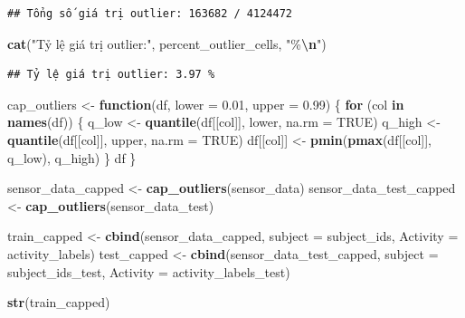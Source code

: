 \documentclass[
]{article}
\newenvironment{Shaded}{\begin{snugshade}}{\end{snugshade}}
\newcommand{\AttributeTok}[1]{\textcolor[rgb]{0.13,0.29,0.53}{#1}}
\newcommand{\ConstantTok}[1]{\textcolor[rgb]{0.56,0.35,0.01}{#1}}
\newcommand{\ControlFlowTok}[1]{\textcolor[rgb]{0.13,0.29,0.53}{\textbf{#1}}}
\newcommand{\FloatTok}[1]{\textcolor[rgb]{0.00,0.00,0.81}{#1}}
\newcommand{\FunctionTok}[1]{\textcolor[rgb]{0.13,0.29,0.53}{\textbf{#1}}}
\newcommand{\NormalTok}[1]{#1}
\newcommand{\OtherTok}[1]{\textcolor[rgb]{0.56,0.35,0.01}{#1}}
\newcommand{\SpecialCharTok}[1]{\textcolor[rgb]{0.81,0.36,0.00}{\textbf{#1}}}
\newcommand{\StringTok}[1]{\textcolor[rgb]{0.31,0.60,0.02}{#1}}
\begin{document}
\begin{verbatim}
## Tổng số giá trị outlier: 163682 / 4124472
\end{verbatim}

\begin{Shaded}
\begin{Highlighting}[]
\FunctionTok{cat}\NormalTok{(}\StringTok{"Tỷ lệ giá trị outlier:"}\NormalTok{, percent\_outlier\_cells, }\StringTok{"\%}\SpecialCharTok{\textbackslash{}n}\StringTok{"}\NormalTok{)}
\end{Highlighting}
\end{Shaded}

\begin{verbatim}
## Tỷ lệ giá trị outlier: 3.97 %
\end{verbatim}

\begin{Shaded}
\begin{Highlighting}[]
\NormalTok{cap\_outliers }\OtherTok{\textless{}{-}} \ControlFlowTok{function}\NormalTok{(df, }\AttributeTok{lower =} \FloatTok{0.01}\NormalTok{, }\AttributeTok{upper =} \FloatTok{0.99}\NormalTok{) \{}
  \ControlFlowTok{for}\NormalTok{ (col }\ControlFlowTok{in} \FunctionTok{names}\NormalTok{(df)) \{}
\NormalTok{    q\_low }\OtherTok{\textless{}{-}} \FunctionTok{quantile}\NormalTok{(df[[col]], lower, }\AttributeTok{na.rm =} \ConstantTok{TRUE}\NormalTok{)}
\NormalTok{    q\_high }\OtherTok{\textless{}{-}} \FunctionTok{quantile}\NormalTok{(df[[col]], upper, }\AttributeTok{na.rm =} \ConstantTok{TRUE}\NormalTok{)}
\NormalTok{    df[[col]] }\OtherTok{\textless{}{-}} \FunctionTok{pmin}\NormalTok{(}\FunctionTok{pmax}\NormalTok{(df[[col]], q\_low), q\_high)}
\NormalTok{  \}}
\NormalTok{  df}
\NormalTok{\}}

\NormalTok{sensor\_data\_capped }\OtherTok{\textless{}{-}} \FunctionTok{cap\_outliers}\NormalTok{(sensor\_data)}
\NormalTok{sensor\_data\_test\_capped }\OtherTok{\textless{}{-}} \FunctionTok{cap\_outliers}\NormalTok{(sensor\_data\_test)}

\NormalTok{train\_capped }\OtherTok{\textless{}{-}} \FunctionTok{cbind}\NormalTok{(sensor\_data\_capped, }\AttributeTok{subject =}\NormalTok{ subject\_ids, }\AttributeTok{Activity =}\NormalTok{ activity\_labels)}
\NormalTok{test\_capped }\OtherTok{\textless{}{-}} \FunctionTok{cbind}\NormalTok{(sensor\_data\_test\_capped, }\AttributeTok{subject =}\NormalTok{ subject\_ids\_test, }\AttributeTok{Activity =}\NormalTok{ activity\_labels\_test)}

\FunctionTok{str}\NormalTok{(train\_capped)}
\end{Highlighting}
\end{Shaded}
\end{document}
